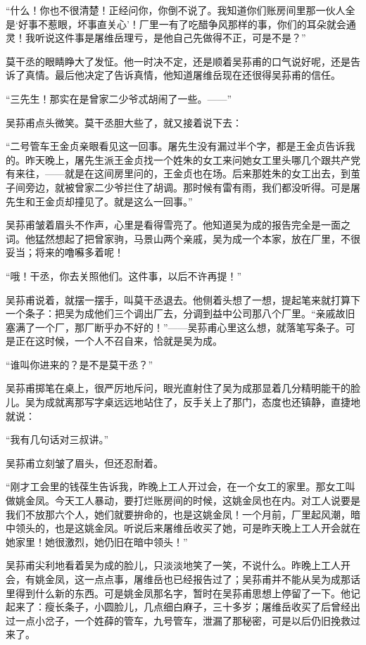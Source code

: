 \par “什么！你也不很清楚！正经问你，你倒不说了。我知道你们账房间里那一伙人全是‘好事不惹眼，坏事直关心’！厂里一有了吃醋争风那样的事，你们的耳朵就会通灵！我听说这件事是屠维岳理亏，是他自己先做得不正，可是不是？”
\par 莫干丞的眼睛睁大了发怔。他一时决不定，还是顺着吴荪甫的口气说好呢，还是告诉了真情。最后他决定了告诉真情，他知道屠维岳现在还很得吴荪甫的信任。
\par “三先生！那实在是曾家二少爷忒胡闹了一些。——”
\par 吴荪甫点头微笑。莫干丞胆大些了，就又接着说下去：
\par “二号管车王金贞亲眼看见这一回事。屠先生没有漏过半个字，都是王金贞告诉我的。昨天晚上，屠先生派王金贞找一个姓朱的女工来问她女工里头哪几个跟共产党有来往，——就是在这间房里问的，王金贞也在场。后来那姓朱的女工出去，到茧子间旁边，就被曾家二少爷拦住了胡调。那时候有雷有雨，我们都没听得。可是屠先生和王金贞却撞见了。就是这么一回事。”
\par 吴荪甫皱着眉头不作声，心里是看得雪亮了。他知道吴为成的报告完全是一面之词。他猛然想起了把曾家驹，马景山两个亲戚，吴为成一个本家，放在厂里，不很妥当；将来的噜囌多着呢！
\par “哦！干丞，你去关照他们。这件事，以后不许再提！”
\par 吴荪甫说着，就摆一摆手，叫莫干丞退去。他侧着头想了一想，提起笔来就打算下一个条子：把吴为成他们三个调出厂去，分调到益中公司那八个厂里。“亲戚故旧塞满了一个厂，那厂断乎办不好的！”——吴荪甫心里这么想，就落笔写条子。可是正在这时候，一个人不召自来，恰就是吴为成。
\par “谁叫你进来的？是不是莫干丞？”
\par 吴荪甫掷笔在桌上，很严厉地斥问，眼光直射住了吴为成那显着几分精明能干的脸儿。吴为成就离那写字桌远远地站住了，反手关上了那门，态度也还镇静，直捷地就说：
\par “我有几句话对三叔讲。”
\par 吴荪甫立刻皱了眉头，但还忍耐着。
\par “刚才工会里的钱葆生告诉我，昨晚上工人开过会，在一个女工的家里。那女工叫做姚金凤。今天工人暴动，要打烂账房间的时候，这姚金凤也在内。对工人说要是我们不放那六个人，她们就要拚命的，也是这姚金凤！一个月前，厂里起风潮，暗中领头的，也是这姚金凤。听说后来屠维岳收买了她，可是昨天晚上工人开会就在她家里！她很激烈，她仍旧在暗中领头！”
\par 吴荪甫尖利地看着吴为成的脸儿，只淡淡地笑了一笑，不说什么。昨晚上工人开会，有姚金凤，这一点点事，屠维岳也已经报告过了；吴荪甫并不能从吴为成那话里得到什么新的东西。可是姚金凤那名字，暂时在吴荪甫思想上停留了一下。他记起来了：瘦长条子，小圆脸儿，几点细白麻子，三十多岁；屠维岳收买了后曾经出过一点小岔子，一个姓薛的管车，九号管车，泄漏了那秘密，可是以后仍旧挽救过来了。
